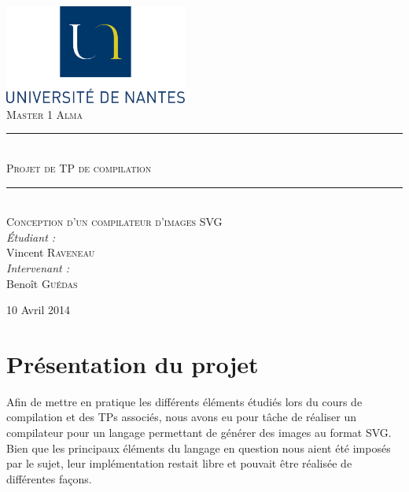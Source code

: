 \documentclass[a4paper, 12pt]{report}
\newcommand{\HRule}{\rule{\linewidth}{0.5mm}}
\begin{document}
\begin{titlepage}
	\begin{center}

		\includegraphics[width=0.45\textwidth]{logoUN.png}~\\[2cm]

		\textsc{\LARGE Master 1 Alma}\\[1.5cm]

		\HRule \\[0.5cm]
		{ \textsc{\Large Projet de TP de compilation}\\[0.5cm] }
		\HRule \\[0.5cm]

		\textsc{\Large Conception d'un compilateur d'images SVG}\\[1.5cm]

		\emph{\'Etudiant :}\\
		Vincent \textsc{Raveneau}\\
		\vspace{0.5cm}
		\emph{Intervenant :} \\
		Beno\^it \textsc{Guédas}
	
		\vfill

		{\large 10 Avril 2014}

	\end{center}
\end{titlepage}

\renewcommand{\contentsname}{Sommaire}
\tableofcontents
\newpage

\chapter{Présentation du projet}

Afin de mettre en pratique les différents éléments étudiés lors du cours de compilation et des TPs associés, nous avons eu pour tâche de réaliser un compilateur pour un langage permettant de générer des images au format SVG. Bien que les principaux éléments du langage en question nous aient été imposés par le sujet, leur implémentation restait libre et pouvait être réalisée de différentes façons.\\
\end{document}
